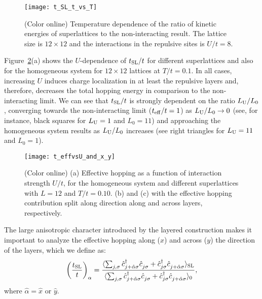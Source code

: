 \documentclass[aps,pra,reprint,twocolumn,showpacs,longbibliography,superscriptaddress]{revtex4-1}
\begin{document}
\begin{figure}[!tb] %
  \texttt{[image: t\_SL\_t\_vs\_T]}
 \caption{(Color online) Temperature dependence of the ratio of kinetic energies of superlattices to the non-interacting result. The lattice size is $12\times12$ and the interactions in the repulsive sites is $U/t=8$.}
 \label{fig:t_SL_t_vs_T}
\end{figure}

Figure~\ref{fig:t_effvsU_and_x_y}(a) shows the $U$-dependence of $t_{\rm SL}/t$  for different superlattices and also for the homogeneous system for $12\times12$ lattices at $T/t=0.1$. In all cases, increasing $U$ induces charge localization in at least the repulsive layers and, therefore, decreases the total hopping energy in comparison to the non-interacting limit. We can see that $t_{\rm SL}/t$ is strongly dependent on the ratio $L_{\rm U}/L_0$, converging towards the non-interacting limit ($t_{\rm eff}/t=1$) as  $L_{\rm U}/L_0 \to 0 $ (see, for instance, black squares for $L_{\rm U}=1$ and $L_0=11$) and approaching the homogeneous system results as $L_{\rm U}/L_0$ increases (see right triangles for $L_{\rm U}=11$ and $L_0=1$).

\begin{figure}[!tb] %
  \texttt{[image: t\_effvsU\_and\_x\_y]}
 \caption{(Color online) (a) Effective hopping as a function of interaction strength  $U/t$, for the homogeneous system and different  superlattices  with  $ L=12 $ and  $T/t= 0.10$. (b) and (c) with the effective hopping contribution split along direction along and across layers, respectively.}
 \label{fig:t_effvsU_and_x_y}
\end{figure}

The large anisotropic character introduced by the layered construction makes it important to analyze the effective hopping along ($x$) and across ($y$) the direction of the layers, which we define as:
\begin{equation}
\left(\frac {t_{\rm SL}} {t}\right)_{\alpha}=
\frac {\langle  \sum_{j,\sigma} \hat c^\dagger_{j+\hat{\alpha}\sigma} \hat c_{j \sigma}^{\phantom\dagger}+ \hat c^\dagger_{j\sigma} \hat c_{j +\hat{\alpha}\sigma}^{\phantom\dagger}  \rangle_{\rm SL}}  {\langle \sum_{j,\sigma} \hat c^\dagger_{j+\hat{\alpha}\sigma} \hat c_{j \sigma}^{\phantom\dagger}+ \hat c^\dagger_{j\sigma} \hat c_{j +\hat{\alpha}\sigma}^{\phantom\dagger}  \rangle_0},
\end{equation}
where $\hat \alpha = \hat x$ or $\hat y$.
\end{document}
